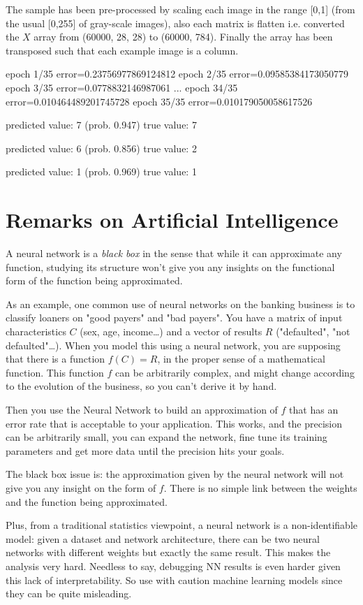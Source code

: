 The sample has been pre-processed by scaling each image in the range [0,1] (from the usual [0,255] of gray-scale images), also each matrix is flatten i.e. converted the $X$ array from (60000, 28, 28) to (60000, 784). Finally the array has been transposed such that each example image is a column.


\begin{ioutput}
epoch 1/35  error=0.23756977869124812
epoch 2/35  error=0.09585384173050779
epoch 3/35  error=0.0778832146987061
...
epoch 34/35  error=0.010464489201745728
epoch 35/35  error=0.010179050058617526

predicted value: 7 (prob. 0.947)
true value: 7

predicted value: 6 (prob. 0.856)
true value: 2

predicted value: 1 (prob. 0.969)
true value: 1
\end{ioutput}

\section{Remarks on Artificial Intelligence}

A neural network is a \emph{black box} in the sense that while it can approximate any function, studying its structure won't give you any insights on the functional form of the function being approximated.

As an example, one common use of neural networks on the banking business is to classify loaners on "good payers" and "bad payers". You have a matrix of input characteristics $C$ (sex, age, income\ldots) and a vector of results $R$ ("defaulted", "not defaulted"\ldots). When you model this using a neural network, you are supposing that there is a function $f(C)=R$, in the proper sense of a mathematical function. This function $f$ can be arbitrarily complex, and might change according to the evolution of the business, so you can't derive it by hand.

Then you use the Neural Network to build an approximation of $f$ that has an error rate that is acceptable to your application. This works, and the precision can be arbitrarily small, you can expand the network, fine tune its training parameters and get more data until the precision hits your goals.

The black box issue is: the approximation given by the neural network will not give you any insight on the form of $f$. There is no simple link between the weights and the function being approximated. 

Plus, from a traditional statistics viewpoint, a neural network is a non-identifiable model: given a dataset and network architecture, there can be two neural networks with different weights but exactly the same result. This makes the analysis very hard.
Needless to say, debugging NN results is even harder given this lack of interpretability. So use with caution machine learning models since they can be quite misleading.
 